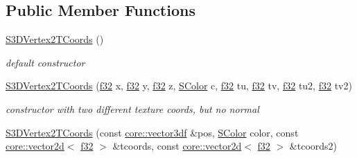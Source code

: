 \subsection*{Public Member Functions}
\begin{DoxyCompactItemize}
\item 
\mbox{\label{structirr_1_1video_1_1S3DVertex2TCoords_a576818fd5d7b120a8266a5f0f6ea8215}} 
\hyperlink{structirr_1_1video_1_1S3DVertex2TCoords_a576818fd5d7b120a8266a5f0f6ea8215}{S3\+D\+Vertex2\+T\+Coords} ()
\begin{DoxyCompactList}\small\item\em default constructor \end{DoxyCompactList}\item 
\mbox{\label{structirr_1_1video_1_1S3DVertex2TCoords_a8a1284825d35ca6448f694688ba2337b}} 
\hyperlink{structirr_1_1video_1_1S3DVertex2TCoords_a8a1284825d35ca6448f694688ba2337b}{S3\+D\+Vertex2\+T\+Coords} (\hyperlink{namespaceirr_a0277be98d67dc26ff93b1a6a1d086b07}{f32} x, \hyperlink{namespaceirr_a0277be98d67dc26ff93b1a6a1d086b07}{f32} y, \hyperlink{namespaceirr_a0277be98d67dc26ff93b1a6a1d086b07}{f32} z, \hyperlink{classirr_1_1video_1_1SColor}{S\+Color} c, \hyperlink{namespaceirr_a0277be98d67dc26ff93b1a6a1d086b07}{f32} tu, \hyperlink{namespaceirr_a0277be98d67dc26ff93b1a6a1d086b07}{f32} tv, \hyperlink{namespaceirr_a0277be98d67dc26ff93b1a6a1d086b07}{f32} tu2, \hyperlink{namespaceirr_a0277be98d67dc26ff93b1a6a1d086b07}{f32} tv2)
\begin{DoxyCompactList}\small\item\em constructor with two different texture coords, but no normal \end{DoxyCompactList}\item 
\mbox{\label{structirr_1_1video_1_1S3DVertex2TCoords_a9fa652c1a470fd17548cfacb5e0dfa31}} 
\hyperlink{structirr_1_1video_1_1S3DVertex2TCoords_a9fa652c1a470fd17548cfacb5e0dfa31}{S3\+D\+Vertex2\+T\+Coords} (const \hyperlink{namespaceirr_1_1core_a06f169d08b5c429f5575acb7edbad811}{core\+::vector3df} \&pos, \hyperlink{classirr_1_1video_1_1SColor}{S\+Color} color, const \hyperlink{classirr_1_1core_1_1vector2d}{core\+::vector2d}$<$ \hyperlink{namespaceirr_a0277be98d67dc26ff93b1a6a1d086b07}{f32} $>$ \&tcoords, const \hyperlink{classirr_1_1core_1_1vector2d}{core\+::vector2d}$<$ \hyperlink{namespaceirr_a0277be98d67dc26ff93b1a6a1d086b07}{f32} $>$ \&tcoords2)

\end{DoxyCompactItemize}
